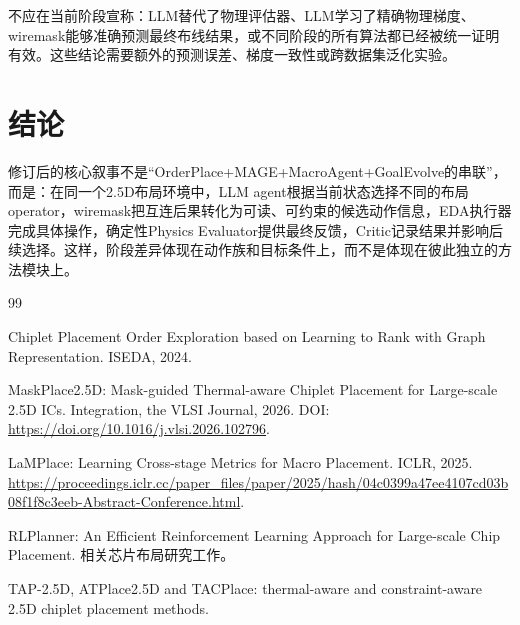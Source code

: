 \documentclass[UTF8,a4paper,12pt]{ctexart}
\begin{document}
不应在当前阶段宣称：LLM替代了物理评估器、LLM学习了精确物理梯度、wiremask能够准确预测最终布线结果，或不同阶段的所有算法都已经被统一证明有效。这些结论需要额外的预测误差、梯度一致性或跨数据集泛化实验。

\section{结论}

修订后的核心叙事不是“OrderPlace+MAGE+MacroAgent+GoalEvolve的串联”，而是：在同一个2.5D布局环境中，LLM agent根据当前状态选择不同的布局operator，wiremask把互连后果转化为可读、可约束的候选动作信息，EDA执行器完成具体操作，确定性Physics Evaluator提供最终反馈，Critic记录结果并影响后续选择。这样，阶段差异体现在动作族和目标条件上，而不是体现在彼此独立的方法模块上。

\begin{thebibliography}{99}

Chiplet Placement Order Exploration based on Learning to Rank with Graph Representation. ISEDA, 2024.

MaskPlace2.5D: Mask-guided Thermal-aware Chiplet Placement for Large-scale 2.5D ICs. Integration, the VLSI Journal, 2026. DOI: \url{https://doi.org/10.1016/j.vlsi.2026.102796}.

LaMPlace: Learning Cross-stage Metrics for Macro Placement. ICLR, 2025. \url{https://proceedings.iclr.cc/paper_files/paper/2025/hash/04c0399a47ee4107cd03b08f1f8c3eeb-Abstract-Conference.html}.

RLPlanner: An Efficient Reinforcement Learning Approach for Large-scale Chip Placement. 相关芯片布局研究工作。

TAP-2.5D, ATPlace2.5D and TACPlace: thermal-aware and constraint-aware 2.5D chiplet placement methods.

\end{thebibliography}
\end{document}
